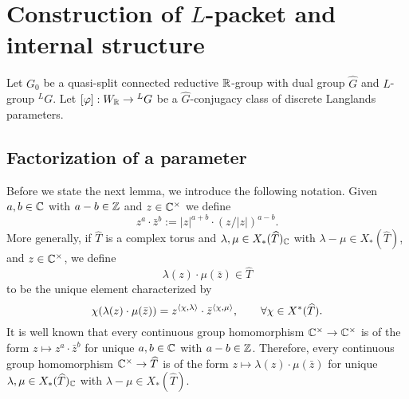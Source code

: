 \documentclass{article}
\theoremstyle{definition}
\numberwithin{equation}{section}
\renewcommand{\-}{\hyp{}}
\newcommand{\g}{\mathfrak g}
\newcommand{\K}{\mathcal K}
\begin{document}
\begin{comment}
Note that
$$
\K
\begin{pmatrix}0&-i\\0&0
\end{pmatrix}=\{\begin{pmatrix}0&-i\\z&0
\end{pmatrix}\mid z\in\C\}
$$
and
$$
\K\cap i\g(\R)=
\{\begin{pmatrix}0&-i\\iy&0
\end{pmatrix}\mid y\in\R\}\ni H_{\pi(\lambda_{ik})}=\begin{pmatrix}0&-\frac{ik}8\\\frac{ik}8&0\end{pmatrix}\quad (k>0).
$$
as required by Proposition \ref{p:whittaker}.
Similarly
$$
\K\begin{pmatrix}0&i\\0&0\end{pmatrix}\cap i\g(\R)\ni H_{\pi(\lambda_{ik})}=\begin{pmatrix}0&-\frac{ik}8\\\frac{ik}8&0\end{pmatrix}\quad (k<0).
$$



\end{comment}

\section{Construction of $L$\-packet and internal structure} \label{sec:cons}

Let $G_0$ be a quasi-split connected reductive $\mathbb{R}$-group with dual group $\hat G$ and $L$\-group $^LG$.
Let $[\varphi] : W_{\mathbb{R}} \to {^LG}$ be a $\hat G$-conjugacy class of discrete Langlands parameters.

\subsection{Factorization of a parameter} \label{sub:fac}

Before we state the next lemma, we introduce the following notation. Given $a,b \in \mathbb{C}$ with $a-b \in \mathbb{Z}$ and $z \in \mathbb{C}^\times$ we define
\[ z^a \cdot \bar z^b := |z|^{a+b} \cdot (z/|z|)^{a-b}. \]
More generally, if $\hat T$ is a complex torus and $\lambda,\mu \in X_*(\widehat T)_{\mathbb{C}}$ with $\lambda-\mu \in X_*(\hat T)$, and $z \in \mathbb{C}^\times$, we define
\[ \lambda(z) \cdot \mu(\bar z) \in \hat T \]
to be the unique element characterized by 
\[ \chi(\lambda(z) \cdot \mu(\bar z)) = z^{\langle\chi,\lambda\rangle} \cdot \bar z^{\langle\chi,\mu\rangle},\qquad \forall \chi \in X^*(\widehat T).\]
It is well known that every continuous group homomorphism $\mathbb{C}^\times \to \mathbb{C}^\times$ is of the form $z \mapsto z^a \cdot \bar z^b$ for unique $a,b \in \mathbb{C}$ with $a-b \in \mathbb{Z}$. Therefore, every continuous group homomorphism $\mathbb{C}^\times \to \widehat T$ is of the form $z \mapsto \lambda(z) \cdot \mu(\bar z)$ for unique $\lambda,\mu \in X_*(\widehat T)_{\mathbb{C}}$ with $\lambda-\mu \in X_*(\hat T)$.
\end{document}

